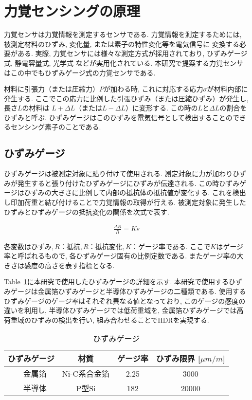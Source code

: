 \section{力覚センシングの原理}
力覚センサは力覚情報を測定するセンサである. 
力覚情報を測定するためには, 被測定材料のひずみ, 変化量, または素子の特性変化等を電気信号に
変換する必要がある. 
実際, 力覚センサには様々な測定方式が採用されており, 
ひずみゲージ式\cite{nishiwaki2002six}\cite{Liang2010}, 
静電容量式\cite{Beyeler2009}, 
光学式\cite{Kim2013a}\cite{su20093}\cite{polygerinos2010novel}
などが実用化されている.
本研究で提案する力覚センサはこの中でもひずみゲージ式の力覚センサである. 

材料に引張力（または圧縮力）$P$が加わる時, これに対応する応力$σ$が材料内部に発生する.
ここでこの応力に比例した引張ひずみ（または圧縮ひずみ）が発生し, 長さ$L$の材料は
$L + \Delta L$（または$L - \Delta L$）に変形する. 
この時の$L$と$\Delta L$の割合をひずみと呼ぶ. 
ひずみゲージはこのひずみを電気信号として検出することのできるセンシング素子のことである. 

\subsection*{ひずみゲージ}
ひずみゲージは被測定対象に貼り付けて使用される. 
測定対象に力が加わりひずみが発生すると張り付けたひずみゲージにひずみが伝達される. 
この時ひずみゲージはひずみの大きさに比例して内部の抵抗体の抵抗値が変化する. 
これを検出し印加荷重と結び付けることで力覚情報の取得が行える. 
被測定対象に発生したひずみとひずみゲージの抵抗変化の関係を次式で表す. 

\begin{eqnarray}
    \frac{\Delta R}{R} = K \varepsilon 
\end{eqnarray}

各変数は$ひずみ, R：抵抗, R：抵抗変化, K：ゲージ率$である. 
ここで$K$はゲージ率と呼ばれるもので, 各ひずみゲージ固有の比例定数である. 
またゲージ率の大きさは感度の高さを表す指標となる. 

Table~\ref{tb:gage}に本研究で使用したひずみゲージの詳細を示す. 
本研究で使用するひずみゲージは金属箔ひずみゲージと半導体ひずみゲージの二種類である. 
使用するひずみゲージのゲージ率はそれぞれ異なる値となっており,  
このゲージの感度の違いを利用し, 半導体ひずみゲージでは低荷重域を, 
金属箔ひずみゲージでは高荷重域のひずみの検出を行い, 
組み合わせることでHDRを実現する. 

\begin{table}[h]
    \caption{ひずみゲージ}\label{tb:gage}
    \begin{center}
     \begin{tabular}{ c c c c }
      \hline
      ひずみゲージ & 材質 & ゲージ率 & ひずみ限界 [$\mu m/m$] \\
      \hline
    　金属箔 & Ni-C系合金箔 & 2.25 & 3000\\
      \hline
    　半導体 & P型Si & 182 & 20000 \\
      \hline   
     \end{tabular}
    \end{center}
   \end{table}



